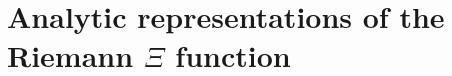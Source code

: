 \chapter{Analytic representations of the Riemann \texorpdfstring{$\Xi$}{Xi} function}\label{vol1:ch2}

